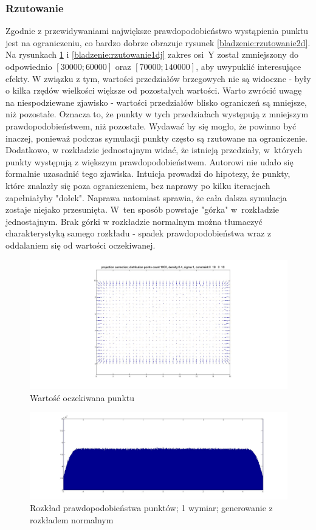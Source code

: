 \documentclass{mini}
\begin{document}
\subsubsection*{Rzutowanie}
Zgodnie z przewidywaniami największe prawdopodobieństwo wystąpienia punktu jest na ograniczeniu, co bardzo dobrze obrazuje rysunek \ref{bladzenie:rzutowanie2d}. Na rysunkach \ref{bladzenie:rzutowanie1dn} i \ref{bladzenie:rzutowanie1dj} zakres osi~Y został zmniejszony do odpowiednio $[30000;60000]$ oraz $[70000;140000]$, aby uwypuklić interesujące efekty. W związku z tym, wartości przedziałów brzegowych nie są widoczne - były o kilka rzędów wielkości większe od pozostałych wartości. Warto zwrócić uwagę na niespodziewane zjawisko - wartości przedziałów blisko ograniczeń są mniejsze, niż pozostałe. Oznacza to, że punkty w tych przedziałach występują z mniejszym prawdopodobieństwem, niż pozostałe. Wydawać by się mogło, że powinno być inaczej, ponieważ podczas symulacji punkty często są rzutowane na ograniczenie. Dodatkowo, w rozkładzie jednostajnym widać, że istnieją przedziały, w~których punkty występują z większym prawdopodobieństwem. Autorowi nie udało się formalnie uzasadnić tego zjawiska. Intuicja prowadzi do hipotezy, że punkty, które znalazły się poza ograniczeniem, bez naprawy po kilku iteracjach zapełniałyby "dołek". Naprawa natomiast sprawia, że cała dalsza symulacja zostaje niejako przesunięta. W~ten sposób powstaje "górka" w~rozkładzie jednostajnym. Brak górki w rozkładzie normalnym można tłumaczyć charakterystyką samego rozkładu - spadek prawdopodobieństwa wraz z oddalaniem się od wartości oczekiwanej.

\begin{figure}[H]
\centering
\includegraphics[width=\textwidth]{projection2dprzesuniecie}
\caption{Wartość oczekiwana punktu}
\end{figure}

\begin{figure}[H]
\centering
\includegraphics[width=\textwidth]{p_n_50M_1__5_5}
\caption{Rozkład prawdopodobieństwa punktów; 1 wymiar; generowanie z rozkładem normalnym}
\label{bladzenie:rzutowanie1dn}
\end{figure}
\end{document}
